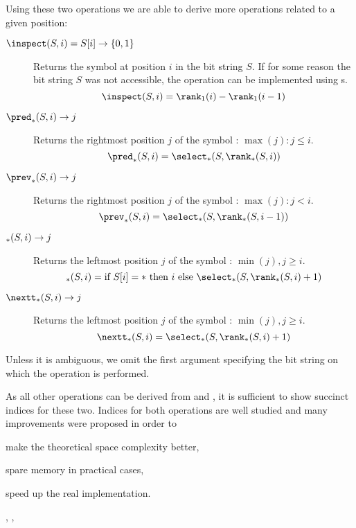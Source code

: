 Using these two operations we are able to derive more operations related to a given position:
\begin{description}
	\item[$\inspect(S, i) = S[i\char93 \rightarrow \{0, 1\}$]
	Returns the symbol at position $i$ in the bit string $S$.
	If for some reason the bit string $S$ was not accessible, the operation can be implemented using \rank{}s.
	$$ \inspect(S, i) = \rank_1(i) - \rank_1(i - 1) $$

	\item[$\pred_{\ph}(S, i) \rightarrow j$]
	Returns the rightmost position $j$ of the symbol \ph{}: $\max(j) : j \le i$.
	$$ \pred_{\ph}(S, i) = \select_{\ph}(S, \rank_{\ph}(S, i)) $$
	
	\item[$\prev_{\ph}(S, i) \rightarrow j$]
	Returns the rightmost position $j$ of the symbol \ph{}: $\max(j) : j < i$.
	$$ \prev_{\ph}(S, i) = \select_{\ph}(S, \rank_{\ph}(S, i - 1)) $$

	\item[$\succ_{\ph}(S, i) \rightarrow j$]
	Returns the leftmost position $j$ of the symbol \ph{}: $\min(j), j \ge i$.
	$$ \succ_{\ph}(S, i) = \textrm{if}\ S[i] = \ph\ \textrm{then}\ i \ \textrm{else}\ \select_{\ph}(S, \rank_{\ph}(S, i) + 1) $$

	\item[$\nextt_{\ph}(S, i) \rightarrow j$]
	Returns the leftmost position $j$ of the symbol \ph{}: $\min(j), j \ge i$.
	$$ \nextt_{\ph}(S, i) = \select_{\ph}(S, \rank_{\ph}(S, i) + 1) $$
\end{description}

Unless it is ambiguous, we omit the first argument specifying the bit string on which the operation is performed.

\bigbreak

As all other operations can be derived from \rank{} and \select{}, it is sufficient to show succinct indices for these two.
Indices for both operations are well studied and many improvements were proposed in order to
\begin{iteminline}
	\item make the theoretical space complexity better,
	\item spare memory in practical cases,
	\item speed up the real implementation.
\end{iteminline}
\cite{gonzalez2005practical}, \cite{kim2005efficient}, \cite{makinen2007rank}

